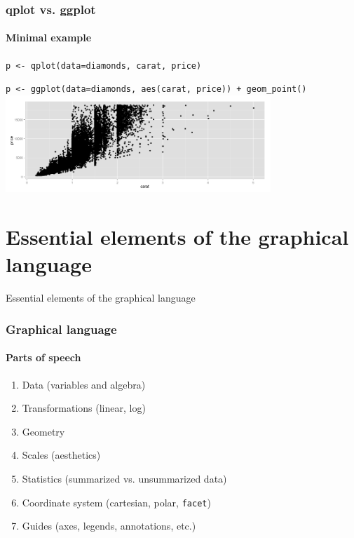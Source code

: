 \documentclass{beamer}
\begin{document}
\begin{frame}\frametitle{qplot vs. ggplot}
\framesubtitle{Minimal example}

\footnotesize\texttt{p <- qplot(data=diamonds, carat, price)}

\bigskip 

\footnotesize\texttt{p <- ggplot(data=diamonds, aes(carat, price)) + geom\_point()} 
\includegraphics[width=100mm,scale=0.5]{qplotbw.png}
\end{frame}


\section[Essential elements of the language]{Essential elements of the graphical language}

\begin{frame}
\begin{center}
Essential elements of the graphical language
\end{center}
\end{frame}

\begin{frame}\frametitle{Graphical language}
\framesubtitle{Parts of speech}
	\begin{enumerate}
	\item \alert{Data} (variables and algebra)
	\item Transformations (linear, log)
	\item \alert{Geometry} 
	\item Scales (\alert{aesthetics})
	\item Statistics (summarized vs. unsummarized data)
	\item Coordinate system (cartesian, polar, \texttt{facet})
	\item Guides (axes, legends, annotations, etc.)
	\end{enumerate}
\end{frame}
\end{document}
